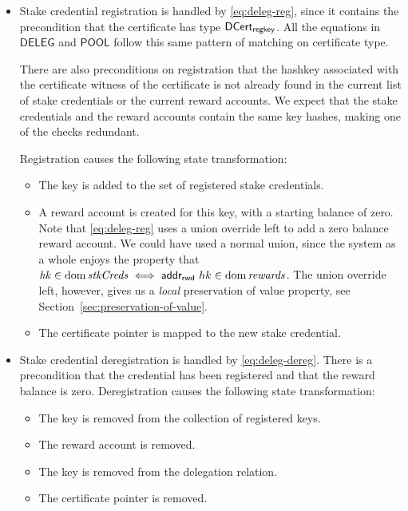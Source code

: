 \begin{itemize}
\item Stake credential registration is handled by \cref{eq:deleg-reg}, since it
  contains the precondition that the certificate has type $\mathsf{DCert_{regkey}}$.  All
  the equations in $\mathsf{DELEG}$ and $\mathsf{POOL}$ follow this same pattern
  of matching on certificate type.

  There are also preconditions on registration that the hashkey associated with
  the certificate witness of the certificate is not already found in the current
  list of stake credentials or the current reward accounts.
  We expect that the stake credentials and the reward accounts contain the
  same key hashes, making one of the checks redundant.

    Registration causes the following state transformation:
    \begin{itemize}
    \item The key is added to the set of registered stake credentials.
      \item A reward account is created for this key, with a starting balance of zero.
        Note that \cref{eq:deleg-reg} uses a union override left to add
        a zero balance reward account.
        We could have used a normal union, since the system as a whole enjoys the property that
        $\var{hk}\in\dom{\var{stkCreds}}\iff \addrRw \var{hk}\in\dom{\var{rewards}}$.
        The union override left, however, gives us a \textit{local}
        preservation of value property, see Section~\cref{sec:preservation-of-value}.
      \item The certificate pointer is mapped to the new stake credential.
    \end{itemize}

  \item Stake credential deregistration is handled by \cref{eq:deleg-dereg}.
    There is a precondition that the credential has been registered and that
    the reward balance is zero.  Deregistration causes the following state
    transformation:
    \begin{itemize}
      \item The key is removed from the collection of registered keys.
      \item The reward account is removed.
      \item The key is removed from the delegation relation.
      \item The certificate pointer is removed.
    \end{itemize}


\end{itemize}
